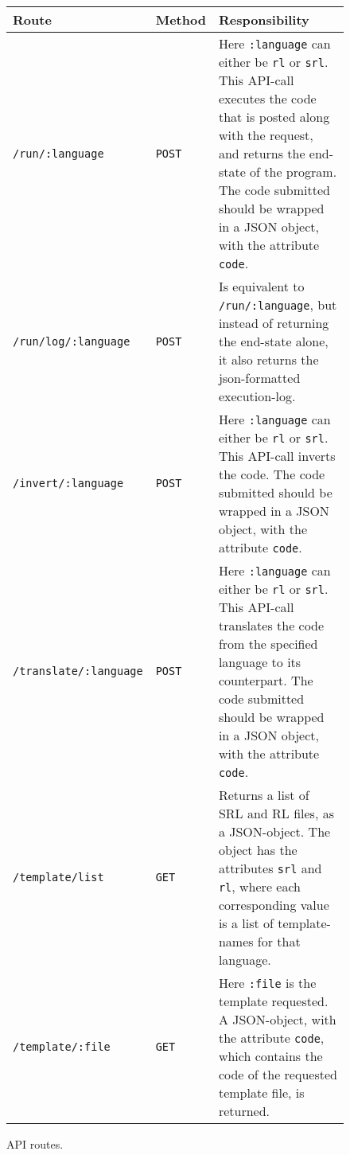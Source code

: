 \begin{figure}[H]
  \begin{tabular}{|l|l|p{6.7cm}|}\hline
    \textbf{Route} & \textbf{Method} & \textbf{Responsibility}\\\hline
    \texttt{/run/:language} & \texttt{POST} & Here \texttt{:language} can either be \texttt{rl} or \texttt{srl}.
                                                This API-call executes the code that is posted along with the request, and returns the end-state of the program.
                                                The code submitted should be wrapped in a JSON object, with the attribute \texttt{code}.\\\hline
    \texttt{/run/log/:language} & \texttt{POST} & Is equivalent to \texttt{/run/:language}, but instead of returning the end-state
                                                    alone, it also returns the json-formatted execution-log.\\\hline
    \texttt{/invert/:language} & \texttt{POST} & Here \texttt{:language} can either be \texttt{rl} or \texttt{srl}.
                                                This API-call inverts the code.
                                                The code submitted should be wrapped in a JSON object, with the attribute \texttt{code}.\\\hline
    \texttt{/translate/:language} & \texttt{POST} & Here \texttt{:language} can either be \texttt{rl} or \texttt{srl}.
                                                This API-call translates the code from the specified language to its counterpart.
                                                The code submitted should be wrapped in a JSON object, with the attribute \texttt{code}.\\\hline
    \texttt{/template/list}  & \texttt{GET} & Returns a list of SRL and RL files, as a JSON-object. The object has the attributes \texttt{srl} and \texttt{rl}, where each corresponding value is a list of template-names for that language. \\\hline
    \texttt{/template/:file} & \texttt{GET} & Here \texttt{:file} is the template requested.
                                              A JSON-object, with the attribute \texttt{code}, which contains the code of the requested template file, is returned.\\\hline
  \end{tabular}
  \caption{API routes.}
  \label{fig:full_api}
\end{figure}

